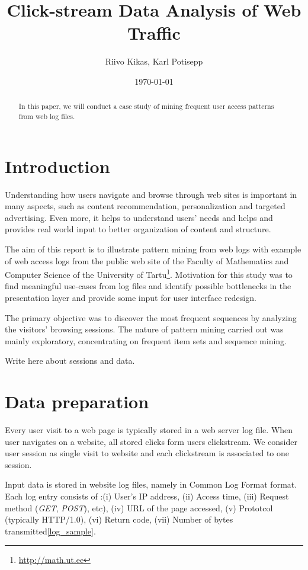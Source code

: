 \documentclass[english,a4paper]{article}
\begin{document}
\title{Click-stream Data Analysis of Web Traffic}
\author{Riivo Kikas, Karl Potisepp}
\date{\today}
\maketitle

\begin{abstract}
In  this paper, we will conduct a case study of mining frequent user access patterns from web log files.
\end{abstract}

\section{Introduction} 
Understanding how users navigate and browse through web sites is important in many aspects, such as content recommendation,
personalization and targeted advertising. Even more, it helps to understand users' needs and helps and provides real world input to better organization of content and structure.

The aim of this report is to illustrate pattern mining from web logs with example of web access logs from the public web site of the Faculty of Mathematics and Computer Science of the University of Tartu\footnote{\url{http://math.ut.ee}}. Motivation for this study was to find meaningful use-cases from log files and identify possible bottlenecks in the presentation layer and provide some input for user interface redesign. 


The primary objective was to discover the most frequent sequences by analyzing the visitors' browsing sessions. The nature of pattern mining carried out was mainly exploratory, concentrating on frequent item sets and sequence mining.

Write here about sessions and data.

\section{Data preparation} 
Every user visit to a web page is typically stored in a web server log file. When user navigates on a website, all stored clicks form users clickstream. We consider user session as single visit to website and each clickstream is associated to one session.

Input data is stored in website log files, namely in Common Log Format\cite{ref_clf} format. Each log entry consists of :(i) User's IP address, (ii) Access time, (iii) Request method (\emph{GET}, \emph{POST}), etc), (iv) URL of the page accessed, (v) Prototcol (typically HTTP/1.0), (vi) Return code, (vii) Number of bytes transmitted\ref{log_sample}.
\end{document}
